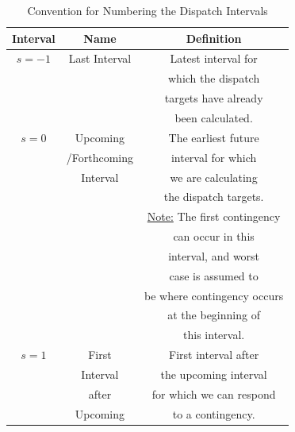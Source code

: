 \documentclass[preprint,12pt,3p]{elsarticle}
\begin{document}
\begin{table}[ht] 

\caption{Convention for Numbering the Dispatch Intervals} %

\centering %

\begin{tabular}{| c | c | c |} %

\hline\hline %

Interval & Name & Definition \\ [0.5ex] %


\hline %


$s=-1$ & Last Interval & Latest interval for \\ &  &  which the dispatch \\ &  &  targets have already \\ &  &  been calculated. \\ 
\hline %
$s=0$ & Upcoming & The earliest future \\ & /Forthcoming & interval for which \\ & Interval &  we are calculating \\ &  &  the dispatch targets. \\ &  &  \underline{Note:} The first contingency \\ &  &  can occur in this \\ &  &  interval, and worst \\ &  &  case is assumed to \\ &  &  be where contingency occurs \\ &  &  at the beginning of \\ &  &  this interval. \\  [1ex] %
\hline %
$s=1$ & First & First interval after \\ & Interval &  the upcoming interval \\ & after &  for which we can respond \\ & Upcoming &  to a contingency. \\  [1ex] %
\hline %

\end{tabular} 

\label{table:DispatchIntervalConvention} %
\end{table} 
\fi
\end{document}
